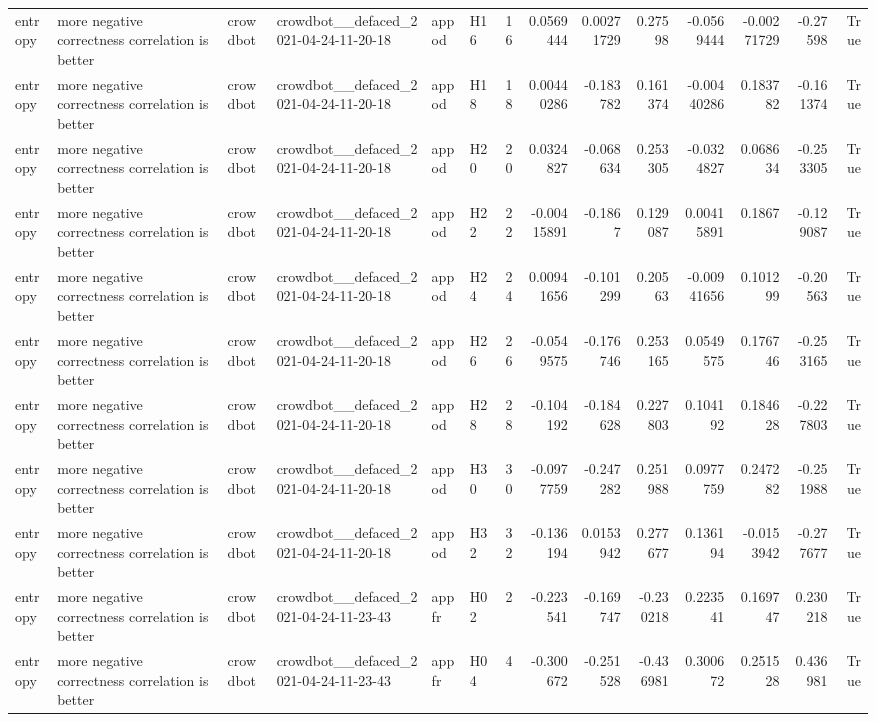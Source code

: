 \begin{longtable}{llllllrrrrrrrr}
entropy & more negative correctness correlation is better & crowdbot & crowdbot\_\_defaced\_2021-04-24-11-20-18 & appod & H16 & 16 & 0.0569444 & 0.00271729 & 0.27598 & -0.0569444 & -0.00271729 & -0.27598 & True \\
entropy & more negative correctness correlation is better & crowdbot & crowdbot\_\_defaced\_2021-04-24-11-20-18 & appod & H18 & 18 & 0.00440286 & -0.183782 & 0.161374 & -0.00440286 & 0.183782 & -0.161374 & True \\
entropy & more negative correctness correlation is better & crowdbot & crowdbot\_\_defaced\_2021-04-24-11-20-18 & appod & H20 & 20 & 0.0324827 & -0.068634 & 0.253305 & -0.0324827 & 0.068634 & -0.253305 & True \\
entropy & more negative correctness correlation is better & crowdbot & crowdbot\_\_defaced\_2021-04-24-11-20-18 & appod & H22 & 22 & -0.00415891 & -0.1867 & 0.129087 & 0.00415891 & 0.1867 & -0.129087 & True \\
entropy & more negative correctness correlation is better & crowdbot & crowdbot\_\_defaced\_2021-04-24-11-20-18 & appod & H24 & 24 & 0.00941656 & -0.101299 & 0.20563 & -0.00941656 & 0.101299 & -0.20563 & True \\
entropy & more negative correctness correlation is better & crowdbot & crowdbot\_\_defaced\_2021-04-24-11-20-18 & appod & H26 & 26 & -0.0549575 & -0.176746 & 0.253165 & 0.0549575 & 0.176746 & -0.253165 & True \\
entropy & more negative correctness correlation is better & crowdbot & crowdbot\_\_defaced\_2021-04-24-11-20-18 & appod & H28 & 28 & -0.104192 & -0.184628 & 0.227803 & 0.104192 & 0.184628 & -0.227803 & True \\
entropy & more negative correctness correlation is better & crowdbot & crowdbot\_\_defaced\_2021-04-24-11-20-18 & appod & H30 & 30 & -0.0977759 & -0.247282 & 0.251988 & 0.0977759 & 0.247282 & -0.251988 & True \\
entropy & more negative correctness correlation is better & crowdbot & crowdbot\_\_defaced\_2021-04-24-11-20-18 & appod & H32 & 32 & -0.136194 & 0.0153942 & 0.277677 & 0.136194 & -0.0153942 & -0.277677 & True \\
entropy & more negative correctness correlation is better & crowdbot & crowdbot\_\_defaced\_2021-04-24-11-23-43 & appfr & H02 & 2 & -0.223541 & -0.169747 & -0.230218 & 0.223541 & 0.169747 & 0.230218 & True \\
entropy & more negative correctness correlation is better & crowdbot & crowdbot\_\_defaced\_2021-04-24-11-23-43 & appfr & H04 & 4 & -0.300672 & -0.251528 & -0.436981 & 0.300672 & 0.251528 & 0.436981 & True \\

\end{longtable}
